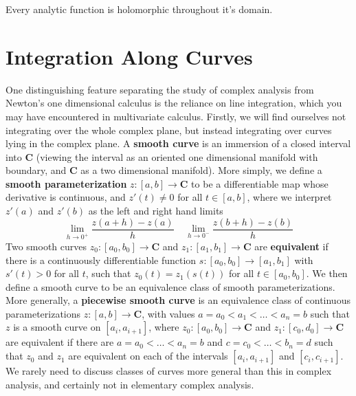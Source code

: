 \begin{corollary}
    Every analytic function is holomorphic throughout it's domain.
\end{corollary}











\section{Integration Along Curves}

One distinguishing feature separating the study of complex analysis from Newton's one dimensional calculus is the reliance on line integration, which you may have encountered in multivariate calculus. Firstly, we will find ourselves not integrating over the whole complex plane, but instead integrating over curves lying in the complex plane. A {\bf smooth curve} is an immersion of a closed interval into $\mathbf{C}$ (viewing the interval as an oriented one dimensional manifold with boundary, and $\mathbf{C}$ as a two dimensional manifold). More simply, we define a {\bf smooth parameterization} $z: [a,b] \to \mathbf{C}$ to be a differentiable map whose derivative is continuous, and $z'(t) \neq 0$ for all $t \in [a,b]$, where we interpret $z'(a)$ and $z'(b)$ as the left and right hand limits
%
\[ \lim_{h \to 0^+} \frac{z(a + h) - z(a)}{h}\ \ \ \ \ \lim_{h \to 0^-} \frac{z(b + h) - z(b)}{h} \]
%
Two smooth curves $z_0: [a_0,b_0] \to \mathbf{C}$ and $z_1: [a_1,b_1] \to \mathbf{C}$ are {\bf equivalent} if there is a continuously differentiable function $s: [a_0,b_0] \to [a_1,b_1]$ with $s'(t) > 0$ for all $t$, such that $z_0(t) = z_1(s(t))$ for all $t \in [a_0,b_0]$. We then define a smooth curve to be an equivalence class of smooth parameterizations. More generally, a {\bf piecewise smooth curve} is an equivalence class of continuous parameterizations $z: [a,b] \to \mathbf{C}$, with values $a = a_0 < a_1 < \dots < a_n = b$ such that $z$ is a smooth curve on $[a_i,a_{i+1}]$, where $z_0: [a_0,b_0] \to \mathbf{C}$ and $z_1:[c_0,d_0] \to \mathbf{C}$ are equivalent if there are $a = a_0 < \dots < a_n = b$ and $c = c_0 < \dots < b_n = d$ such that $z_0$ and $z_1$ are equivalent on each of the intervals $[a_i,a_{i+1}]$ and $[c_i,c_{i+1}]$. We rarely need to discuss classes of curves more general than this in complex analysis, and certainly not in elementary complex analysis.

